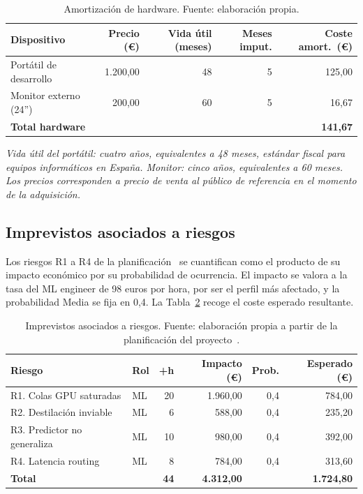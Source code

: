 \documentclass[11pt,a4paper]{article}
\begin{document}
\begin{table}[H]
\centering
\caption{Amortización de hardware. Fuente: elaboración propia.}
\label{tab:hardware}
\footnotesize
\begin{tabular}{l r r r r}
\toprule
\textbf{Dispositivo} & \textbf{Precio (\euro{})} & \textbf{Vida útil (meses)} & \textbf{Meses imput.} & \textbf{Coste amort.\ (\euro{})} \\
\midrule
Portátil de desarrollo & 1.200,00 & 48 & 5 & 125,00 \\
Monitor externo (24'') & 200,00   & 60 & 5 & 16,67  \\
\midrule
\textbf{Total hardware} & & & & \textbf{141,67} \\
\bottomrule
\end{tabular}
\end{table}

\noindent\textit{\scriptsize Vida útil del portátil: cuatro años, equivalentes a 48 meses, estándar fiscal para equipos informáticos en España. Monitor: cinco años, equivalentes a 60 meses. Los precios corresponden a precio de venta al público de referencia en el momento de la adquisición.}

\subsection{Imprevistos asociados a riesgos}

Los riesgos R1 a R4 de la planificación~\cite{gep23e2} se cuantifican como el producto de su impacto económico por su probabilidad de ocurrencia. El impacto se valora a la tasa del ML engineer de 98 euros por hora, por ser el perfil más afectado, y la probabilidad Media se fija en 0,4. La Tabla~\ref{tab:imprevistos} recoge el coste esperado resultante.

\begin{table}[H]
\centering
\caption{Imprevistos asociados a riesgos. Fuente: elaboración propia a partir de la planificación del proyecto~\cite{gep23e2}.}
\label{tab:imprevistos}
\footnotesize
\begin{tabular}{l l r r r r}
\toprule
\textbf{Riesgo} & \textbf{Rol} & \textbf{+h} & \textbf{Impacto (\euro{})} & \textbf{Prob.} & \textbf{Esperado (\euro{})} \\
\midrule
R1. Colas GPU saturadas     & ML & 20 & 1.960,00 & 0,4 & 784,00  \\
R2. Destilación inviable    & ML & 6  & 588,00   & 0,4 & 235,20  \\
R3. Predictor no generaliza & ML & 10 & 980,00   & 0,4 & 392,00  \\
R4. Latencia routing        & ML & 8  & 784,00   & 0,4 & 313,60  \\
\midrule
\textbf{Total} & & \textbf{44} & \textbf{4.312,00} & & \textbf{1.724,80} \\
\bottomrule
\end{tabular}
\end{table}
\end{document}
